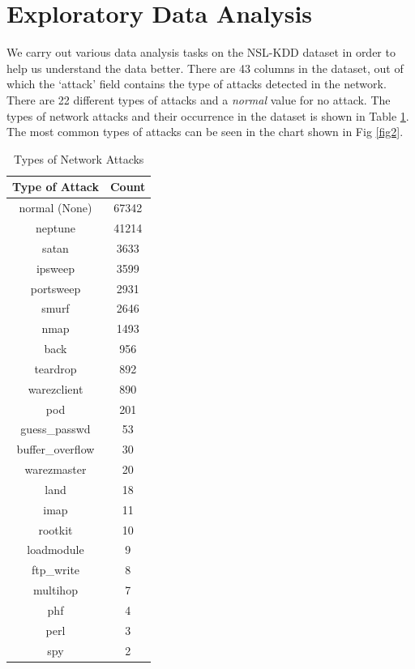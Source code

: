 \documentclass[conference]{IEEEtran}
\begin{document}
\section{Exploratory Data Analysis}
We carry out various data analysis tasks on the NSL-KDD dataset in order to help us understand the data better. There are 43 columns in the dataset, out of which the `attack' field contains the type of attacks detected in the network. There are 22 different types of attacks and a \emph{normal} value for no attack. The types of network attacks and their occurrence in the dataset is shown in Table \ref{tab1}. The most common types of attacks can be seen in the chart shown in Fig \ref{fig2}.

\begin{table}[htbp]
\caption{Types of Network Attacks}
\begin{center}
\begin{tabular}{|c|c|}
\hline
Type of Attack & Count \\
\hline
normal (None)	&	67342	\\
neptune	&	41214	\\
satan	&	3633	\\
ipsweep	&	3599	\\
portsweep	&	2931	\\
smurf	&	2646	\\
nmap	&	1493	\\
back	&	956	\\
teardrop	&	892	\\
warezclient	&	890	\\
pod	&	201	\\
guess\_passwd	&	53	\\
buffer\_overflow	&	30	\\
warezmaster	&	20	\\
land	&	18	\\
imap	&	11	\\
rootkit	&	10	\\
loadmodule	&	9	\\
ftp\_write	&	8	\\
multihop	&	7	\\
phf	&	4	\\
perl	&	3	\\
spy	&	2	\\
\hline
\end{tabular}
\label{tab1}
\end{center}
\end{table}
\end{document}
